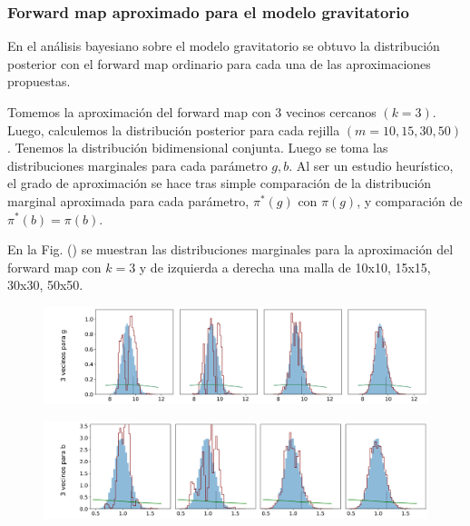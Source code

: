 \subsubsection{Forward map aproximado para el modelo gravitatorio}

En el análisis bayesiano sobre el modelo gravitatorio se obtuvo la distribución posterior con el forward map ordinario para cada una de las aproximaciones propuestas. 

Tomemos la aproximación del forward map con 3 vecinos cercanos $(k= 3)$. Luego, calculemos la distribución posterior para cada rejilla $(m = 10, 15, 30, 50)$. Tenemos la distribución bidimensional conjunta. Luego se toma las distribuciones marginales para cada parámetro $g,b$. Al ser un estudio heurístico, el grado de aproximación se hace tras simple comparación de la distribución marginal aproximada  para cada parámetro, $\pi^{*}(g)$ con $\pi(g)$, y comparación de $\pi^{*}(b) = \pi(b)$.


En la Fig. () se muestran las distribuciones marginales para la aproximación del forward map con $k = 3$ y de izquierda a derecha una malla de 10x10, 15x15, 30x30, 50x50.

\begin{figure}[H] 
    \centering 
    \includegraphics[width = 16 cm ]{img/Exp_Central_gravedad_Sigma/Figuras/Generales/Convergencia_theta1_1_gravedad_sigma.png} 
\end{figure} 

\begin{figure}[H] 
    \centering 
    \includegraphics[width = 16 cm ]{img/Exp_Central_gravedad_Sigma/Figuras/Generales/Convergencia_theta2_1_gravedad_sigma.png} 
\end{figure} 

